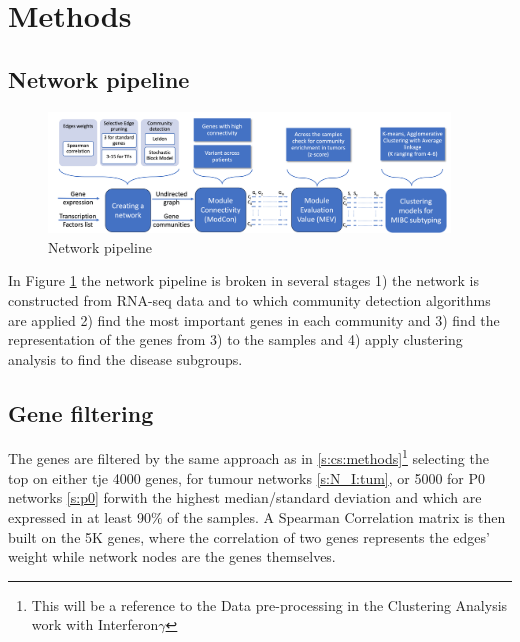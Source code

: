 \section{Methods} \label{s:N_I:methods}

\subsection{Network pipeline}



\begin{figure}
    \centering
    \includegraphics[width=0.95\textwidth,height=0.95\textheight,keepaspectratio]{Sections/Network_I/Resources/Methods/network_pipeline.png}
    \caption{Network pipeline}
    \label{fig:N_I:network_pipeline}
\end{figure}


In Figure \ref{fig:N_I:network_pipeline} the network pipeline is broken in several stages 1) the network is constructed from RNA-seq data and to which community detection algorithms are applied 2) find the most important genes in each community and 3) find the representation of the genes from 3) to the samples and 4) apply clustering analysis to find the disease subgroups.


\subsection{Gene filtering}
The genes are filtered by the same approach as in \cref{s:cs:methods}\footnote{This will be a reference to the Data pre-processing in the Clustering Analysis work with Interferon$\gamma$} selecting the top on either tje 4000 genes, for tumour networks \cref{s:N_I:tum}, or 5000 for P0 networks \cref{s:p0} forwith the highest median/standard deviation and which are expressed in at least 90\% of the samples. A Spearman Correlation matrix is then built on the 5K genes, where the correlation of two genes represents the edges' weight while network nodes are the genes themselves. 

